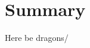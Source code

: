 

\chapter{Summary}

\ifpdf
    \graphicspath{{chapter-summary/Figs/Raster/}{chapter-summary/Figs/PDF/}{chapter-summary/Figs/}}
\else
    \graphicspath{{chapter-summary/Figs/Vector/}{chapter-summary/Figs/}}
\fi

Here be dragons/
